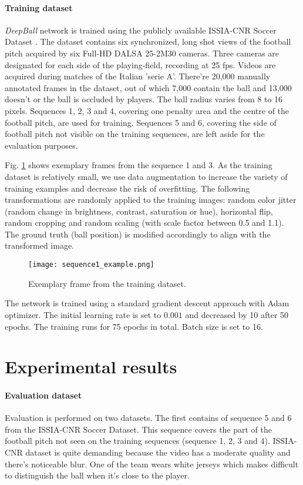 \documentclass[a4paper,twoside]{article}
\begin{document}
\paragraph{Training dataset}
\emph{DeepBall} network is trained using the publicly available ISSIA-CNR Soccer Dataset \cite{DOr09}. The dataset contains six synchronized, long shot views of the football pitch acquired by six Full-HD DALSA 25-2M30 cameras. Three cameras are designated for each side of the playing-field, recording at 25 fps. Videos are acquired during matches of the Italian 'serie A'. There're 20,000 manually annotated frames in the dataset, out of which 7,000 contain the ball and 13,000 doesn't or the ball is occluded by players. The ball radius varies from 8 to 16 pixels. Sequences 1, 2, 3 and 4, covering one penalty area and the centre of the football pitch, are used for training. Sequences 5 and 6, covering the side of football pitch not visible on the training sequences, are left aside for the evaluation purposes.

Fig. \ref{jk:fig:training_sequences} shows exemplary frames from the sequence 1 and 3. As the training dataset is relatively small, we use data augmentation to increase the variety of training examples and decrease the risk of overfitting. The following transformations are randomly applied to the training images: random color jitter (random change in brightness, contrast, saturation or hue), horizontal flip, random cropping and random scaling (with scale factor between 0.5 and 1.1). The ground truth (ball position) is modified accordingly to align with the transformed image.

\begin{figure}
  \centering
  \texttt{[image: sequence1\_example.png]}
\caption{Exemplary frame from the training dataset.}
  \label{jk:fig:training_sequences}
\end{figure}

The network is trained using a standard gradient descent approach with Adam~\cite{King14} optimizer. The initial learning rate is set to $0.001$ and decreased by 10 after 50 epochs. The training runs for 75 epochs in total. Batch size is set to 16.

\section{Experimental results}
\label{jk:section-experimental-results}

\paragraph{Evaluation dataset}
Evaluation is performed on two datasets. The first contains of sequence 5 and 6 from the ISSIA-CNR Soccer Dataset. This sequence covers the part of the football pitch not seen on the training sequences (sequence 1, 2, 3 and 4). ISSIA-CNR dataset is quite demanding because the video has a moderate quality and there's noticeable blur. One of the team wears white jerseys which makes difficult to  distinguish the ball when it's close to the player.
\end{document}

